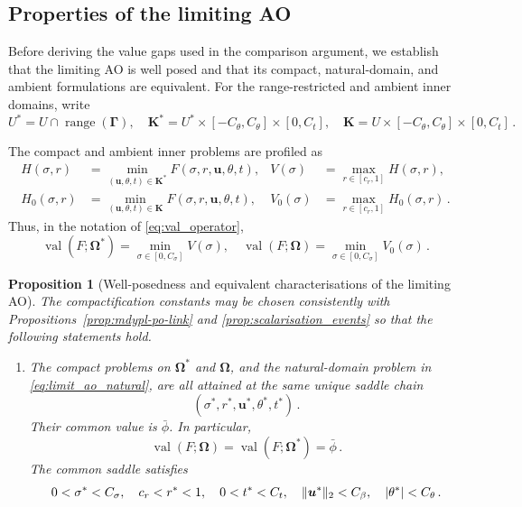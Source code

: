 \documentclass{article}
\makeatletter
\newtheorem{proposition}[theorem]{Proposition}
\theoremstyle{definition}
\newcommand{\vnorm}[1]{%
	\ensuremath{%
		\if@display
		\left\| #1 \right\|
		\else
		\| #1 \|
		\fi
	}%
}
\newcommand{\abs}[1]{%
	\ensuremath{%
		\if@display
		\left| #1 \right|
		\else
		\lvert #1 \rvert
		\fi
	}%
}
\newcommand*{\bb}{\boldsymbol}
\def\bu{\bb{u}}
\newcommand{\range}{\operatorname{range}}
\makeatother
\begin{document}
\begin{bibunit}
\subsection{Properties of the limiting AO}
\label{sec:limiting-AO-properties}

Before deriving the value gaps used in the comparison argument, we establish
that the limiting AO is well posed and that its compact, natural-domain, and
ambient formulations are equivalent. For the range-restricted and ambient
inner domains, write
\begin{equation}
\label{eq:bb-k}
    U^*
    =
    U\cap\range(\bb\Gamma),
    \quad
    \bb K^*
    =
    U^*\times[-C_\theta,C_\theta]\times[0,C_t],
\quad
    \bb K
    =
    U\times[-C_\theta,C_\theta]\times[0,C_t] \,.
\end{equation}

The compact and ambient inner problems are profiled as
\begin{equation}
\label{eq:compact_profiles}
\begin{aligned}
    H(\sigma,r)
    &=
    \underset{(\bu,\theta,t)\in\bb K^*}{\min}
    F(\sigma,r,\bu,\theta,t),
    &
    V(\sigma)
    &=
    \underset{r\in[c_r,1]}{\max}
    H(\sigma,r),
    \\
    H_0(\sigma,r)
    &=
    \underset{(\bu,\theta,t)\in\bb K}{\min}
    F(\sigma,r,\bu,\theta,t),
    &
    V_0(\sigma)
    &=
    \underset{r\in[c_r,1]}{\max}
    H_0(\sigma,r) \,.
\end{aligned}
\end{equation}
Thus, in the notation of \eqref{eq:val_operator},
\begin{equation}
\label{eq:ambient_compact_profiles}
    \operatorname{val}(F;\bb\Omega^*)
    =
    \underset{\sigma\in[0,C_\sigma]}{\min}V(\sigma),
    \quad
    \operatorname{val}(F;\bb\Omega)
    =
    \underset{\sigma\in[0,C_\sigma]}{\min}V_0(\sigma) \,.
\end{equation}

\begin{proposition}[Well-posedness and equivalent characterisations of the limiting AO]
\label{prop:limiting_AO_properties}
The compactification constants may be chosen consistently with
Propositions~\ref{prop:mdypl-po-link} and
\ref{prop:scalarisation_events} so that the following statements hold.
\begin{enumerate}[label=(\roman*)]
    \item
    The compact problems on $\bb\Omega^*$ and $\bb\Omega$, and the
    natural-domain problem in \eqref{eq:limit_ao_natural}, are all attained
    at the same unique saddle chain
    $$
        (\sigma^*,r^*,\bu^*,\theta^*,t^*) \,.
    $$
    Their common value is $\bar\phi$. In particular,
    $$
        \operatorname{val}(F;\bb\Omega)
        =
        \operatorname{val}(F;\bb\Omega^*)
        =
        \bar\phi \,.
    $$
    The common saddle satisfies
    $$
        0<\sigma^*<C_\sigma,
        \quad
        c_r<r^*<1,
        \quad
        0<t^*<C_t,
        \quad
        \vnorm{\bu^*}_2<C_\beta,
        \quad
        \abs{\theta^*}<C_\theta \,.
    $$


\end{enumerate}
\end{proposition}
\end{bibunit}
\end{document}
